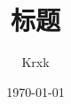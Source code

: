 \documentclass{article}
\begin{document}
\title{标题}
\author{Krxk}
\date{\today}
\maketitle
\newpage
\tableofcontents
\newpage


\end{document}

